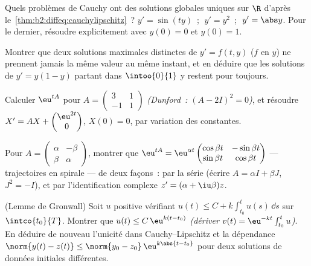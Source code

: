 \begin{exercise}[$\star$]\label{exo:b2:diffeq:2}
Quels problèmes de Cauchy ont des solutions globales uniques sur
$\R$ d'après le~\cref{thm:b2:diffeq:cauchylipschitz}~? $y' =
\sin(ty)$~; $\;y' = y^2$~; $\;y' = \abs y$. Pour le dernier,
résoudre explicitement avec $y(0) = 0$ et $y(0) = 1$.
\end{exercise}

\begin{exercise}[$\star$]\label{exo:b2:diffeq:3}
Montrer que deux solutions maximales distinctes de $y' = f(t,y)$
($f$  en $y$) ne prennent jamais la même valeur au
même instant, et en déduire que les solutions de $y' = y(1 - y)$
partant dans $\intoo{0}{1}$ y restent pour toujours.
\end{exercise}

\begin{exercise}[$\star\star$]\label{exo:b2:diffeq:4}
Calculer $\eu^{tA}$ pour $A = \begin{pmatrix} 3 & 1\\ -1 &
1\end{pmatrix}$ \emph{(Dunford~: $(A - 2I)^2 = 0$)}, et résoudre $X'
= AX + \begin{pmatrix} \eu^{2t}\\ 0\end{pmatrix}$, $X(0) = 0$, par
variation des constantes.
\end{exercise}

\begin{exercise}[$\star\star$]\label{exo:b2:diffeq:5}
Pour $A = \begin{pmatrix} \alpha & -\beta\\ \beta &
\alpha\end{pmatrix}$, montrer que $\eu^{tA} =
\eu^{\alpha t}\begin{pmatrix} \cos\beta t & -\sin\beta t\\
\sin\beta t & \cos\beta t\end{pmatrix}$ --- trajectoires en spirale
--- de deux façons~: par la série (écrire $A = \alpha I + \beta J$,
$J^2 = -I$), et par l'identification complexe $z' = (\alpha +
\iu\beta)z$.
\end{exercise}

\begin{exercise}[$\star\star$]\label{exo:b2:diffeq:6}
(Lemme de Gronwall) Soit $u$  positive vérifiant $u(t)
\leq C + k\int_{t_0}^{t} u(s)\,\dd s$ sur $\intco{t_0}{T}$. Montrer
que $u(t) \leq C\,\eu^{k(t - t_0)}$ \emph{(dériver $v(t) =
\eu^{-kt}\int_{t_0}^t u$)}. En déduire de nouveau l'unicité dans
Cauchy--Lipschitz et la dépendance  $\norm{y(t) -
z(t)} \leq \norm{y_0 - z_0}\,\eu^{k\abs{t - t_0}}$ pour deux
solutions de données initiales différentes.
\end{exercise}

